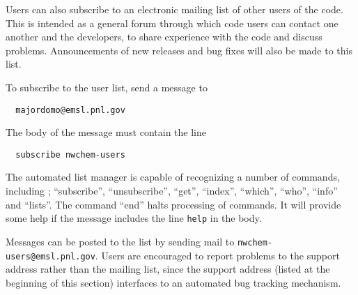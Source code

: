 Users can also subscribe to an electronic mailing list of other users
of the code.  This is intended as a general forum through which code
users can contact one another and the developers, to share experience
with the code and discuss problems.  Announcements of new releases and
bug fixes will also be made to this list. 

To subscribe to the user list, send a message to 
\begin{verbatim}
  majordomo@emsl.pnl.gov
\end{verbatim}
The body of the message must contain the line 
\begin{verbatim}
  subscribe nwchem-users
\end{verbatim}

The automated list manager is capable of recognizing a number of
commands, including ; ``subscribe'', ``unsubscribe'', ``get'', ``index'',
``which'', ``who'', ``info'' and ``lists''.  The command ``end'' halts
processing of commands.  It will provide some help if the message
includes the line {\tt help} in the body.  

Messages can be posted to
the list by sending mail to {\tt nwchem-users@emsl.pnl.gov}.  Users
are encouraged to report problems to the support address rather than the mailing list,
since the support address (listed at the beginning of this section) interfaces to an automated
bug tracking mechanism.


